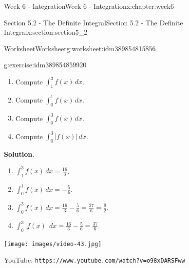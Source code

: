 \documentclass[oneside,10pt,]{book}
\newcommand{\blocktitlefont}{\relax}
\newcommand{\mono}[1]{\texttt{#1}}
\numberwithin{equation}{section}
\newlength{\qrsize}
\newlength{\previewwidth}
\begin{document}
\begin{chapterptx}{Week 6 - Integration}{}{Week 6 - Integration}{}{}{x:chapter:week6}
\begin{sectionptx}{Section 5.2 - The Definite Integral}{}{Section 5.2 - The Definite Integral}{}{}{x:section:section5_2}
\begin{worksheet-subsection}{Worksheet}{}{Worksheet}{}{}{g:worksheet:idm389854815856}
\begin{divisionexercise}{2}{}{}{g:exercise:idm389854859920}
\begin{image}{0}{1}{0}
\end{image}%
%
\begin{enumerate}[label=(\alph*)]
\item{}Compute \(\displaystyle \int_1^3 f(x)\, dx\).%
\item{}Compute \(\displaystyle \int_0^1 f(x)\, dx\).%
\item{}Compute \(\displaystyle \int_0^3 f(x)\, dx\).%
\item{}Compute \(\displaystyle \int_0^3 \vert f(x)\vert \, dx\).%
\end{enumerate}
\textbf{\blocktitlefont Solution}.\hypertarget{g:solution:idm389854906864}{}\quad{}%
\begin{enumerate}[label=(\alph*)]
\item{}\(\displaystyle \int_1^3 f(x)\, dx = \frac{16}{3}\).%
\item{}\(\displaystyle \int_0^1 f(x)\, dx = -\frac 56\).%
\item{}\(\displaystyle \int_0^3 f(x)\, dx = \frac{16}{3}-\frac 56 = \frac{27}{6} = \frac 92\).%
\item{}\(\displaystyle \int_0^3 \vert f(x)\vert \, dx= \frac{16}{3}-\frac 56 = \frac{37}{6}\).%
\end{enumerate}
\end{divisionexercise}%
\end{worksheet-subsection}
\restoregeometry
\setlength{\qrsize}{9em}
\setlength{\previewwidth}{\linewidth}
\addtolength{\previewwidth}{-\qrsize}
\begin{tcbraster}[raster columns=2, raster column skip=1pt, raster halign=center, raster force size=false, raster left skip=0pt, raster right skip=0pt]%
\begin{tcolorbox}[previewstyle, width=\previewwidth]%
\texttt{[image: images/video-43.jpg]}%
\end{tcolorbox}%
\begin{tcolorbox}[qrstyle]%
{\hypersetup{urlcolor=black}}%
\end{tcolorbox}%
\begin{tcolorbox}[captionstyle]%
\small YouTube: \mono{https://www.youtube.com/watch?v=o98xDARSFww}\end{tcolorbox}%
\end{tcbraster}%
\end{sectionptx}
%
%
\typeout{************************************************}
\typeout{************************************************}
%

\end{chapterptx}
\end{document}
